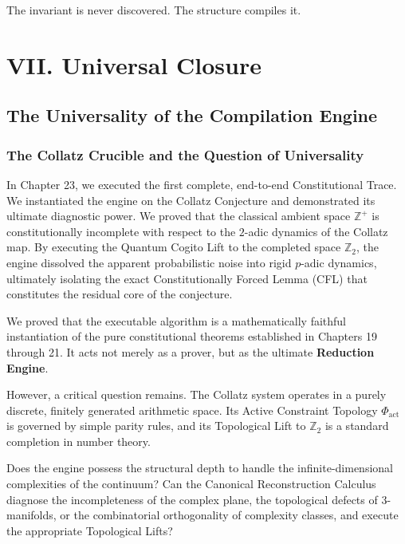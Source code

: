 \documentclass[12pt,openany]{extbook}
\theoremstyle{plain}
\theoremstyle{definition}
\begin{document}
The invariant is never discovered. The structure compiles it.

\part{VII. Universal Closure}


\chapter{The Universality of the Compilation Engine}

\section{The Collatz Crucible and the Question of Universality}

In Chapter 23, we executed the first complete, end-to-end Constitutional Trace. We instantiated the engine on the Collatz Conjecture and demonstrated its ultimate diagnostic power. We proved that the classical ambient space $\mathbb{Z}^+$ is constitutionally incomplete with respect to the $2$-adic dynamics of the Collatz map. By executing the Quantum Cogito Lift to the completed space $\mathbb{Z}_2$, the engine dissolved the apparent probabilistic noise into rigid $p$-adic dynamics, ultimately isolating the exact Constitutionally Forced Lemma (CFL) that constitutes the residual core of the conjecture.

We proved that the executable algorithm is a mathematically faithful instantiation of the pure constitutional theorems established in Chapters 19 through 21. It acts not merely as a prover, but as the ultimate \textbf{Reduction Engine}.

However, a critical question remains. The Collatz system operates in a purely discrete, finitely generated arithmetic space. Its Active Constraint Topology $\Phi_{\mathrm{act}}$ is governed by simple parity rules, and its Topological Lift to $\mathbb{Z}_2$ is a standard completion in number theory.

Does the engine possess the structural depth to handle the infinite-dimensional complexities of the continuum? Can the Canonical Reconstruction Calculus diagnose the incompleteness of the complex plane, the topological defects of $3$-manifolds, or the combinatorial orthogonality of complexity classes, and execute the appropriate Topological Lifts?
\end{document}
